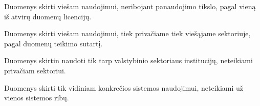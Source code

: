 \documentclass[letterpaper,10pt,lithuanian]{sphinxmanual}
\begin{document}
\begin{fulllineitems}
\label{\detokenize{prieiga:id0}}
\pysigstartsignatures
{}
\pysigstopsignatures{}

\begin{fulllineitems}
\label{\detokenize{prieiga:open}}
\pysigstartsignatures
{}
\pysigstopsignatures
\sphinxAtStartPar
{}

\sphinxAtStartPar
Duomenys skirti viešam naudojimui, neribojant panaudojimo tikslo, pagal
vieną iš atvirų duomenų licencijų.

\end{fulllineitems}


\begin{fulllineitems}
\label{\detokenize{prieiga:public}}
\pysigstartsignatures
{}
\pysigstopsignatures
\sphinxAtStartPar
{}

\sphinxAtStartPar
Duomenys skirti viešam naudojimui, tiek privačiame tiek viešąjame
sektoriuje, pagal duomenų teikimo sutartį.

\end{fulllineitems}


\begin{fulllineitems}
\label{\detokenize{prieiga:protected}}
\pysigstartsignatures
{}
\pysigstopsignatures
\sphinxAtStartPar
{}

\sphinxAtStartPar
Duomenys skirtin naudoti tik tarp valstybinio sektoriaus institucijų,
neteikiami privačiam sektoriui.

\end{fulllineitems}


\begin{fulllineitems}
\label{\detokenize{prieiga:private}}
\pysigstartsignatures
{}
\pysigstopsignatures
\sphinxAtStartPar
{}

\sphinxAtStartPar
Duomenys skirti tik vidiniam konkrečios sistemos naudojimui, neteikiami
už vienos sistemos ribų.

\end{fulllineitems}


\end{fulllineitems}
\end{document}
